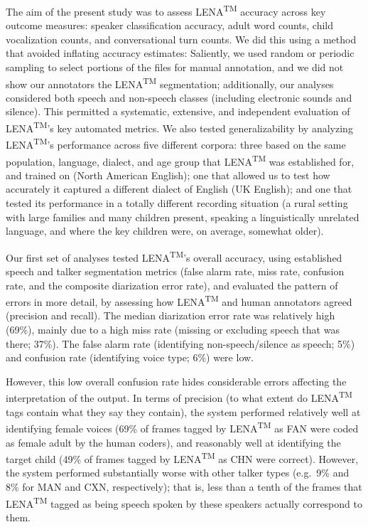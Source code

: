 \documentclass[english,floatsintext,man]{apa6}
\begin{document}
The aim of the present study was to assess LENA\textsuperscript{TM}
accuracy across key outcome measures: speaker classification accuracy,
adult word counts, child vocalization counts, and conversational turn
counts. We did this using a method that avoided inflating accuracy
estimates: Saliently, we used random or periodic sampling to select
portions of the files for manual annotation, and we did not show our
annotators the LENA\textsuperscript{TM} segmentation; additionally, our
analyses considered both speech and non-speech classes (including
electronic sounds and silence). This permitted a systematic, extensive,
and independent evaluation of LENA\textsuperscript{TM}'s key automated
metrics. We also tested generalizability by analyzing
LENA\textsuperscript{TM}'s performance across five different corpora:
three based on the same population, language, dialect, and age group
that LENA\textsuperscript{TM} was established for, and trained on (North
American English); one that allowed us to test how accurately it
captured a different dialect of English (UK English); and one that
tested its performance in a totally different recording situation (a
rural setting with large families and many children present, speaking a
linguistically unrelated language, and where the key children were, on
average, somewhat older).

Our first set of analyses tested LENA\textsuperscript{TM}'s overall
accuracy, using established speech and talker segmentation metrics
(false alarm rate, miss rate, confusion rate, and the composite
diarization error rate), and evaluated the pattern of errors in more
detail, by assessing how LENA\textsuperscript{TM} and human annotators
agreed (precision and recall). The median diarization error rate was
relatively high (69\%), mainly due to a high miss rate (missing or
excluding speech that was there; 37\%). The false alarm rate
(identifying non-speech/silence as speech; 5\%) and confusion rate
(identifying voice type; 6\%) were low.

However, this low overall confusion rate hides considerable errors
affecting the interpretation of the output. In terms of precision (to
what extent do LENA\textsuperscript{TM} tags contain what they say they
contain), the system performed relatively well at identifying female
voices (69\% of frames tagged by LENA\textsuperscript{TM} as FAN were
coded as female adult by the human coders), and reasonably well at
identifying the target child (49\% of frames tagged by
LENA\textsuperscript{TM} as CHN were correct). However, the system
performed substantially worse with other talker types (e.g.~9\% and 8\%
for MAN and CXN, respectively); that is, less than a tenth of the frames
that LENA\textsuperscript{TM} tagged as being speech spoken by these
speakers actually correspond to them.
\end{document}
